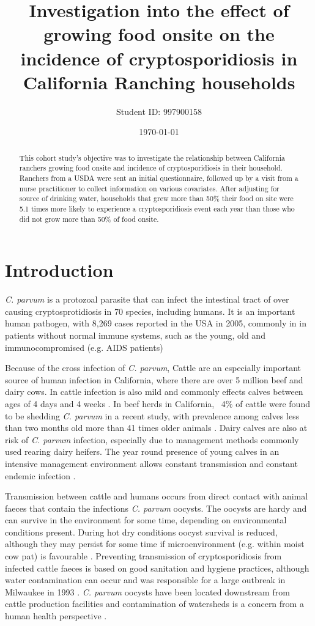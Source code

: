 \documentclass[12pt]{article}
\title{Investigation into the effect of growing food onsite on the incidence of cryptosporidiosis in California Ranching households}
\author{Student ID: 997900158}
\date{\today}
\begin{document}
	\maketitle
	\begin{abstract}
		This cohort study's objective was to investigate the relationship between California ranchers growing food onsite and incidence of cryptosporidiosis in their household.
		Ranchers from a USDA were sent an initial questionnaire, followed up by a visit from a nurse practitioner to collect information on various covariates.
		After adjusting for source of drinking water, households that grew more than 50\% their food  on site were 5.1 times more likely to experience a cryptosporidiosis event each year than those who did not grow more than 50\% of food onsite.

	\end{abstract}

\onehalfspace
	\section{Introduction} 
	\emph{C. parvum} is a protozoal parasite that can infect the intestinal tract of over causing cryptosprotidiosis in  70 species, \cite{Casemore1997} including humans.
	It is an important human pathogen, with 8,269 cases reported in the USA in 2005, commonly in in patients without normal immune systems, such as the young, old and immunocompromised (e.g. AIDS patients) \cite{Yoder2007}


	Because of the cross infection of \emph{C. parvum}, Cattle are an especially important source of human infection in California, where there are over 5 million beef and dairy cows. \cite{WesternFarm}
	In cattle infection is also mild and commonly effects calves between ages of 4 days and 4 weeks \cite{malmo2010}. 
	In beef herds in California, ~4\% of cattle were found to be shedding \emph{C. parvum} in a recent study, with prevalence among calves less than two months old more than 41 times older animals \cite{Atwill1999a}.
	Dairy calves are also at risk of \emph{C. parvum} infection, especially due to management methods commonly used rearing dairy heifers. The year round presence of young calves in an intensive management environment allows constant transmission and constant endemic infection .\cite{Atwill1998}
	
	
	Transmission between cattle and humans occurs from direct contact with animal faeces that contain the infections \emph{C. parvum} oocysts\cite{malmo2010}.
	The oocysts are hardy and can survive in the environment for some time, depending on environmental conditions present. 
	During hot dry conditions oocyst survival is reduced, although they may persist for some time if microenvironment (e.g. within moist cow pat) is favourable \cite{Robertson1992}.
	Preventing transmission of cryptosporidiosis from infected cattle faeces is based on good sanitation and hygiene practices\cite{malmo2010}, although water contamination can occur and was responsible for a large outbreak in Milwaukee in 1993 \cite{Kenzie1994}. 
	\emph{C. parvum} oocysts have been located downstream from cattle production facilities and contamination of watersheds is a concern from a human health perspective \cite{Ong1996}. 
\end{document}
